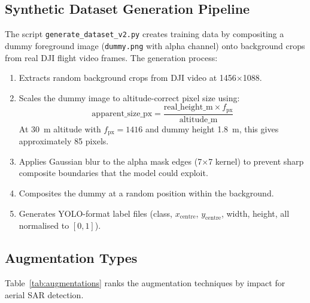 \subsection{Synthetic Dataset Generation Pipeline}

The script \texttt{generate\_dataset\_v2.py} creates training data by compositing
a dummy foreground image (\texttt{dummy.png} with alpha channel) onto background
crops from real DJI flight video frames. The generation process:

\begin{enumerate}
    \item Extracts random background crops from DJI video at 1456$\times$1088.
    \item Scales the dummy image to altitude-correct pixel size using:
          \[
          \text{apparent\_size\_px} = \frac{\text{real\_height\_m} \times f_{\text{px}}}
          {\text{altitude\_m}}
          \]
          At 30~m altitude with $f_{\text{px}} = 1416$ and dummy height 1.8~m, this gives
          approximately 85 pixels.
    \item Applies Gaussian blur to the alpha mask edges (7$\times$7 kernel) to prevent
          sharp composite boundaries that the model could exploit.
    \item Composites the dummy at a random position within the background.
    \item Generates YOLO-format label files (class, $x_\text{centre}$, $y_\text{centre}$,
          width, height, all normalised to $[0, 1]$).
\end{enumerate}

\subsection{Augmentation Types}

Table~\ref{tab:augmentations} ranks the augmentation techniques by impact for
aerial SAR detection.

